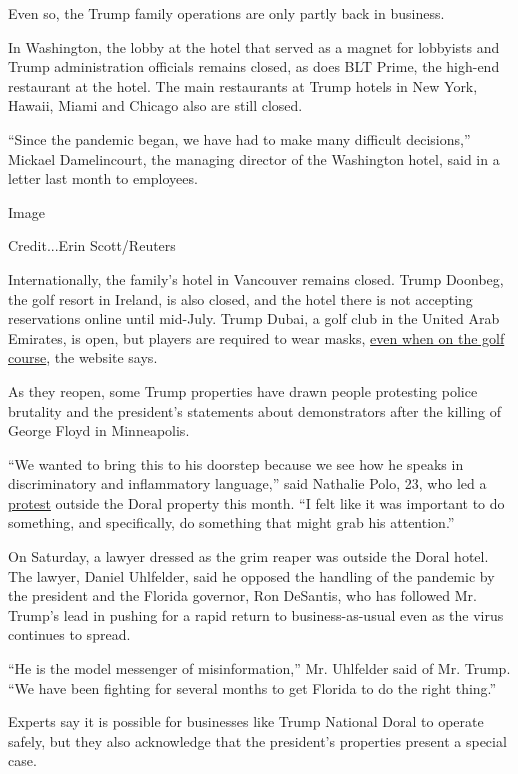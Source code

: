Even so, the Trump family operations are only partly back in business.

In Washington, the lobby at the hotel that served as a magnet for
lobbyists and Trump administration officials remains closed, as does BLT
Prime, the high-end restaurant at the hotel. The main restaurants at
Trump hotels in New York, Hawaii, Miami and Chicago also are still
closed.

``Since the pandemic began, we have had to make many difficult
decisions,'' Mickael Damelincourt, the managing director of the
Washington hotel, said in a letter last month to employees.

Image

Credit...Erin Scott/Reuters

Internationally, the family's hotel in Vancouver remains closed. Trump
Doonbeg, the golf resort in Ireland, is also closed, and the hotel there
is not accepting reservations online until mid-July. Trump Dubai, a golf
club in the United Arab Emirates, is open, but players are required to
wear masks, \href{https://www.trumpgolfdubai.com/tee-times}{even when on
the golf course}, the website says.

As they reopen, some Trump properties have drawn people protesting
police brutality and the president's statements about demonstrators
after the killing of George Floyd in Minneapolis.

``We wanted to bring this to his doorstep because we see how he speaks
in discriminatory and inflammatory language,'' said Nathalie Polo, 23,
who led a
\href{https://www.kusi.com/i/the-latest-protesters-rally-at-trump-golf-resort-in-florida/}{protest}
outside the Doral property this month. ``I felt like it was important to
do something, and specifically, do something that might grab his
attention.''

On Saturday, a lawyer dressed as the grim reaper was outside the Doral
hotel. The lawyer, Daniel Uhlfelder, said he opposed the handling of the
pandemic by the president and the Florida governor, Ron DeSantis, who
has followed Mr. Trump's lead in pushing for a rapid return to
business-as-usual even as the virus continues to spread.

``He is the model messenger of misinformation,'' Mr. Uhlfelder said of
Mr. Trump. ``We have been fighting for several months to get Florida to
do the right thing.''

Experts say it is possible for businesses like Trump National Doral to
operate safely, but they also acknowledge that the president's
properties present a special case.

